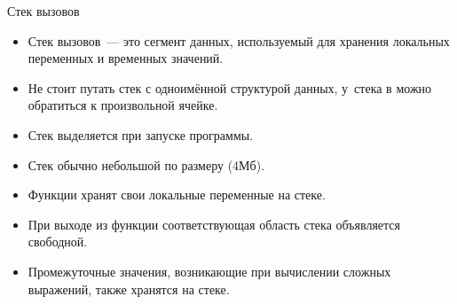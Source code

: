 \documentclass[aspectration=1610,t]{beamer}
\begin{document}
\begin{frame}[fragile]{Стек вызовов}
    \begin{itemize}
        \item Стек вызовов~— это сегмент данных, используемый для хранения локальных
            переменных и временных значений.
        \item Не стоит путать стек с одноимённой структурой данных, у~стека в \langcpp
            можно обратиться к произвольной ячейке.
        \item Стек выделяется при запуске программы.
        \item Стек обычно небольшой по размеру (4Мб).
        \item Функции хранят свои локальные переменные на стеке. 
        \item При выходе из функции соответствующая область стека
            объявляется свободной.
        \item Промежуточные значения, возникающие при вычислении
            сложных выражений, также хранятся на стеке.
    \end{itemize}
\end{frame}
\end{document}
